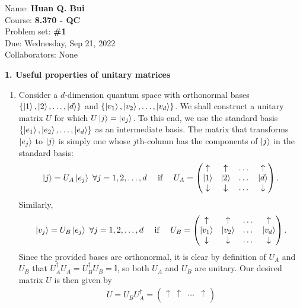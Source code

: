 \documentclass{article}
\theoremstyle{definition}
\begin{document}
\begin{framed}
\noindent Name: \textbf{Huan Q. Bui}\\
Course: \textbf{8.370 - QC}\\
Problem set: \textbf{\#1}\\
Due: Wednesday, Sep 21, 2022\\
Collaborators: None
\end{framed}


\noindent \textbf{1. Useful properties of unitary matrices }

\begin{enumerate}[label=(\alph*)]
	\item Consider a $d$-dimension quantum space with orthonormal bases $\{ \ket{1}, \ket{2}, \dots, \ket{d}\}$ and $\{\ket{v_1}, \ket{v_2}, \dots, \ket{v_d}\}$. We shall construct a unitary matrix $U$ for which $U\ket{j} = \ket{v_j}$. To this end, we use the standard basis $\{ \ket{e_1}, \ket{e_2},\dots, \ket{e_d}\}$ as an intermediate basis. The matrix that transforms $\ket{e_j}$ to $\ket{j}$ is simply one whose $j$th-column has the components of $\ket{j}$ in the standard basis:
	\begin{align*}
		\ket{j} = U_A \ket{e_j} \,\, \forall j=1,2,\dots,d \quad \text{ if } \quad U_A = \begin{pmatrix}
			\uparrow & \uparrow& \dots & \uparrow\\
			\ket{1}& \ket{2}& \dots & \ket{d}\\
			\downarrow& \downarrow& \dots&\downarrow 
		\end{pmatrix}.
	\end{align*}
	Similarly, 
	\begin{align*}
		\ket{v_j} = U_B \ket{e_j} \,\, \forall j=1,2,\dots,d \quad \text{ if } \quad U_B = \begin{pmatrix}
			\uparrow & \uparrow& \dots & \uparrow\\
			\ket{v_1}& \ket{v_2}& \dots & \ket{v_d}\\
			\downarrow& \downarrow& \dots&\downarrow 
		\end{pmatrix}.
	\end{align*}
	Since the provided bases are orthonormal, it is clear by definition of $U_A$ and $U_B$ that $U_A^\dagger U_A = U_B^\dagger U_B = \mathbb{I}$, so both $U_A$ and $U_B$ are unitary. Our desired matrix $U$ is then given by 
	\begin{align*}
		U = U_B U_A^\dagger =  \begin{pmatrix}
			\uparrow & \uparrow& \dots & \uparrow\\

\end{pmatrix}
\end{align*}
\end{enumerate}
\end{document}
